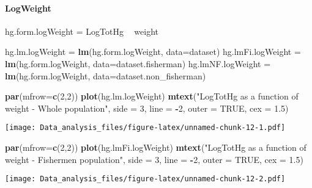\documentclass[12pt,]{article}
\newenvironment{Shaded}{\begin{snugshade}}{\end{snugshade}}
\newcommand{\KeywordTok}[1]{\textcolor[rgb]{0.13,0.29,0.53}{\textbf{#1}}}
\newcommand{\DataTypeTok}[1]{\textcolor[rgb]{0.13,0.29,0.53}{#1}}
\newcommand{\DecValTok}[1]{\textcolor[rgb]{0.00,0.00,0.81}{#1}}
\newcommand{\FloatTok}[1]{\textcolor[rgb]{0.00,0.00,0.81}{#1}}
\newcommand{\StringTok}[1]{\textcolor[rgb]{0.31,0.60,0.02}{#1}}
\newcommand{\OtherTok}[1]{\textcolor[rgb]{0.56,0.35,0.01}{#1}}
\newcommand{\OperatorTok}[1]{\textcolor[rgb]{0.81,0.36,0.00}{\textbf{#1}}}
\newcommand{\NormalTok}[1]{#1}
\let\oldparagraph\paragraph
\renewcommand{\paragraph}[1]{\oldparagraph{#1}\mbox{}}
\begin{document}
\paragraph{LogWeight}\label{logweight}

\begin{Shaded}
\begin{Highlighting}[]
\NormalTok{hg.form.logWeight =}\StringTok{ }\NormalTok{LogTotHg }\OperatorTok{~}\StringTok{ }\NormalTok{weight}

\NormalTok{hg.lm.logWeight =}\StringTok{ }\KeywordTok{lm}\NormalTok{(hg.form.logWeight, }\DataTypeTok{data=}\NormalTok{dataset)}
\NormalTok{hg.lmFi.logWeight =}\StringTok{ }\KeywordTok{lm}\NormalTok{(hg.form.logWeight, }\DataTypeTok{data=}\NormalTok{dataset.fisherman)}
\NormalTok{hg.lmNF.logWeight =}\StringTok{ }\KeywordTok{lm}\NormalTok{(hg.form.logWeight, }\DataTypeTok{data=}\NormalTok{dataset.non_fisherman)}

\KeywordTok{par}\NormalTok{(}\DataTypeTok{mfrow=}\KeywordTok{c}\NormalTok{(}\DecValTok{2}\NormalTok{,}\DecValTok{2}\NormalTok{))}
\KeywordTok{plot}\NormalTok{(hg.lm.logWeight)}
\KeywordTok{mtext}\NormalTok{(}\StringTok{"LogTotHg as a function of weight - Whole population"}\NormalTok{, }\DataTypeTok{side =} \DecValTok{3}\NormalTok{, }\DataTypeTok{line =} \OperatorTok{-}\DecValTok{2}\NormalTok{, }\DataTypeTok{outer =} \OtherTok{TRUE}\NormalTok{, }\DataTypeTok{cex =} \FloatTok{1.5}\NormalTok{)}
\end{Highlighting}
\end{Shaded}

\texttt{[image: Data\_analysis\_files/figure-latex/unnamed-chunk-12-1.pdf]}

\begin{Shaded}
\begin{Highlighting}[]
\KeywordTok{par}\NormalTok{(}\DataTypeTok{mfrow=}\KeywordTok{c}\NormalTok{(}\DecValTok{2}\NormalTok{,}\DecValTok{2}\NormalTok{))}
\KeywordTok{plot}\NormalTok{(hg.lmFi.logWeight)}
\KeywordTok{mtext}\NormalTok{(}\StringTok{"LogTotHg as a function of weight - Fishermen population"}\NormalTok{, }\DataTypeTok{side =} \DecValTok{3}\NormalTok{, }\DataTypeTok{line =} \OperatorTok{-}\DecValTok{2}\NormalTok{, }\DataTypeTok{outer =} \OtherTok{TRUE}\NormalTok{, }\DataTypeTok{cex =} \FloatTok{1.5}\NormalTok{)}
\end{Highlighting}
\end{Shaded}

\texttt{[image: Data\_analysis\_files/figure-latex/unnamed-chunk-12-2.pdf]}
\end{document}
